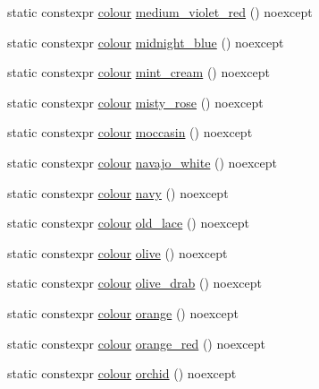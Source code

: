 \begin{DoxyCompactItemize}
static constexpr \mbox{\hyperlink{classmoka_1_1colour}{colour}} \mbox{\hyperlink{classmoka_1_1colour_a65612bcc537f83b7973fd7639d26a22a}{medium\+\_\+violet\+\_\+red}} () noexcept
\item 
static constexpr \mbox{\hyperlink{classmoka_1_1colour}{colour}} \mbox{\hyperlink{classmoka_1_1colour_a3bfea780e8f0f1d4c79716c1890362d6}{midnight\+\_\+blue}} () noexcept
\item 
static constexpr \mbox{\hyperlink{classmoka_1_1colour}{colour}} \mbox{\hyperlink{classmoka_1_1colour_a146279b6490d141db7643651fe501693}{mint\+\_\+cream}} () noexcept
\item 
static constexpr \mbox{\hyperlink{classmoka_1_1colour}{colour}} \mbox{\hyperlink{classmoka_1_1colour_ade045aa0ed34003700a03432da5d072a}{misty\+\_\+rose}} () noexcept
\item 
static constexpr \mbox{\hyperlink{classmoka_1_1colour}{colour}} \mbox{\hyperlink{classmoka_1_1colour_ae642c04d3915e7cffa71e69173391773}{moccasin}} () noexcept
\item 
static constexpr \mbox{\hyperlink{classmoka_1_1colour}{colour}} \mbox{\hyperlink{classmoka_1_1colour_adde5b40c475fd858ba3fe3ee134ed2cb}{navajo\+\_\+white}} () noexcept
\item 
static constexpr \mbox{\hyperlink{classmoka_1_1colour}{colour}} \mbox{\hyperlink{classmoka_1_1colour_a57040c8ecd0e0aae65ab46ecfce017a2}{navy}} () noexcept
\item 
static constexpr \mbox{\hyperlink{classmoka_1_1colour}{colour}} \mbox{\hyperlink{classmoka_1_1colour_a6ea7a59513953cc67947369cdaa4acaa}{old\+\_\+lace}} () noexcept
\item 
static constexpr \mbox{\hyperlink{classmoka_1_1colour}{colour}} \mbox{\hyperlink{classmoka_1_1colour_abecfd112bd69cfe1bab12859666df631}{olive}} () noexcept
\item 
static constexpr \mbox{\hyperlink{classmoka_1_1colour}{colour}} \mbox{\hyperlink{classmoka_1_1colour_a94992b07e270d1c1fe68e335257bd273}{olive\+\_\+drab}} () noexcept
\item 
static constexpr \mbox{\hyperlink{classmoka_1_1colour}{colour}} \mbox{\hyperlink{classmoka_1_1colour_a0a1c8669c878810ccdf468d90d598882}{orange}} () noexcept
\item 
static constexpr \mbox{\hyperlink{classmoka_1_1colour}{colour}} \mbox{\hyperlink{classmoka_1_1colour_abcc8eb871af80fc99257d93f8bda3fcd}{orange\+\_\+red}} () noexcept
\item 
static constexpr \mbox{\hyperlink{classmoka_1_1colour}{colour}} \mbox{\hyperlink{classmoka_1_1colour_aad4bf4e3bb3af8b61fca846655435d00}{orchid}} () noexcept

\end{DoxyCompactItemize}
